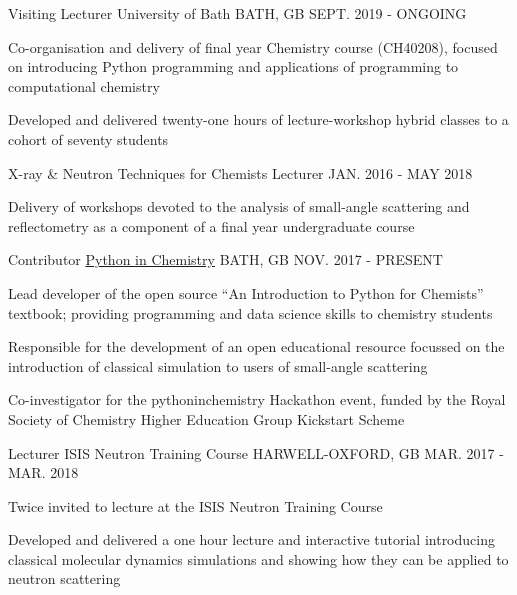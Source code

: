 \begin{cventries}
	\cventry
	{Visiting Lecturer}
	{University of Bath}
	{BATH, GB}
	{SEPT. 2019 - ONGOING}
	{
		\begin{cvitems}
			\item {Co-organisation and delivery of final year Chemistry course (CH40208), focused on introducing Python programming and applications of programming to computational chemistry}
			\item {Developed and delivered twenty-one hours of lecture-workshop hybrid classes to a cohort of seventy students}
		\end{cvitems}
	}
	\cventry
	{X-ray \& Neutron Techniques for Chemists Lecturer}
	{}
	{}
	{JAN. 2016 - MAY 2018}
	{
		\begin{cvitems}
			\item {Delivery of workshops devoted to the analysis of small-angle scattering and reflectometry as a component of a final year undergraduate course}
		\end{cvitems}
	}
	\cventry
	{Contributor}
	{\href{https://pythoninchemistry.org}{Python in Chemistry}}
	{BATH, GB}
	{NOV. 2017 - PRESENT}
	{
		\begin{cvitems}
			\item {Lead developer of the open source ``An Introduction to Python for Chemists'' textbook; providing programming and data science skills to chemistry students}
			\item {Responsible for the development of an open educational resource focussed on the introduction of classical simulation to users of small-angle scattering}
			\item {Co-investigator for the pythoninchemistry Hackathon event, funded by the Royal Society of Chemistry Higher Education Group Kickstart Scheme}
		\end{cvitems}
	}
	\cventry
	{Lecturer}
	{ISIS Neutron Training Course}
	{HARWELL-OXFORD, GB}
	{MAR. 2017 - MAR. 2018}
	{
		\begin{cvitems}
			\item {Twice invited to lecture at the ISIS Neutron Training Course}
			\item {Developed and delivered a one hour lecture and interactive tutorial introducing classical molecular dynamics simulations and showing how they can be applied to neutron scattering}
		\end{cvitems}
	}
\end{cventries}
